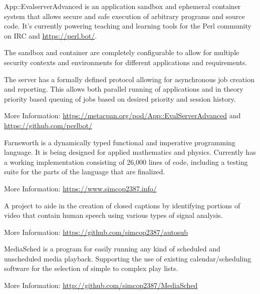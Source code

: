 \documentclass[table,tmargin=1in,bmargin=1in,letterpaper]{resume}
\begin{document}
\begin{compactitem}
\item App::EvalserverAdvanced is an application sandbox and ephemeral container system that allows secure and safe execution of arbitrary programs and source code.  It's currently powering teaching and learning tools for the Perl community on IRC and \url{https://perl.bot/}. 
\item The sandbox and container are completely configurable to allow for multiple security contexts and environments for different applications and requirements.
\item The server has a formally defined protocol allowing for asynchronous job creation and reporting.  This allows both parallel running of applications and in theory priority based queuing of jobs based on desired priority and session history.
\item More Information: \url{https://metacpan.org/pod/App::EvalServerAdvanced} and \url{https://github.com/perlbot/}
\end{compactitem}

\begin{compactitem}
\item Farnsworth is a dynamically typed functional and imperative programming language.  
It is being designed for applied mathematics and physics.  Currently has a working implementation 
consisting of 26,000 lines of code, including a testing suite for the parts of the language that are finalized.
\item More Information: \url{https://www.simcop2387.info/}
\end{compactitem}


\begin{compactitem}
\item A project to aide in the creation of closed captions by identifying portions of 
video that contain human speech using various types of signal analysis.
\item More Information: \url{https://github.com/simcop2387/autosub}
\end{compactitem}


\begin{compactitem}
\item MediaSched is a program for easily running any kind of scheduled and unscheduled media playback.  Supporting the use of existing calendar/scheduling software for the selection of simple to complex play lists.
\item More Information: \url{http://github.com/simcop2387/MediaSched}
\end{compactitem}
\end{document}
